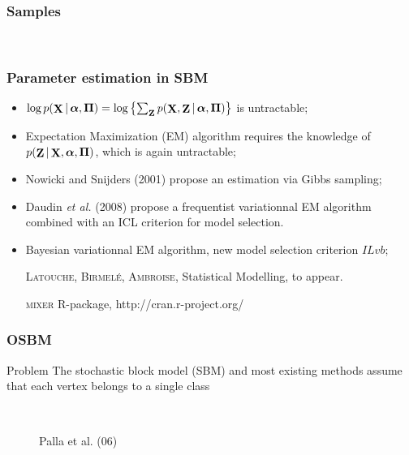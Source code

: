 \documentclass{beamer}
\DeclareMathOperator{\bZ}{{\bf Z}}
\DeclareMathOperator{\bX}{{\bf X}}
\DeclareMathOperator{\balpha}{\boldsymbol{\alpha}}
\DeclareMathOperator{\bPi}{\boldsymbol{\Pi}}
\begin{document}
\begin{frame}
\frametitle{Samples}

\vspace{-1cm}
\begin{figure}
   \\
\end{figure}
\end{frame}




\begin{frame}
\frametitle{Parameter estimation in SBM}

\begin{itemize}
\item  $\log p(\bX|\balpha, \bPi) = \log \left\{\sum_{\bZ} p(\bX, \bZ|\balpha,\bPi)\right\}$ is untractable;
\item  Expectation Maximization (EM) algorithm requires the knowledge of $p(\bZ|\bX, \balpha, \bPi)$, which is again untractable;
\item  Nowicki and Snijders (2001) propose an estimation via Gibbs sampling;
\item  Daudin {\em et al.} (2008) propose a frequentist variationnal EM algorithm combined with an ICL criterion for model selection.
\item Bayesian variationnal EM algorithm, new model selection criterion $ILvb$;


{\tiny \textsc{Latouche, Birmel\'e, Ambroise}, Statistical Modelling, to appear.}


{\tiny \textsc{mixer} R-package, http://cran.r-project.org/ } 
\end{itemize}

\end{frame}


\begin{frame}
\frametitle{OSBM}


\begin{block}{Problem}
  The stochastic block model (SBM) and most existing methods assume that each vertex belongs to a single class
\end{block}

\begin{figure}
  \\
 \caption{Palla et al. (06)}
\end{figure}
\end{frame}
\end{document}
